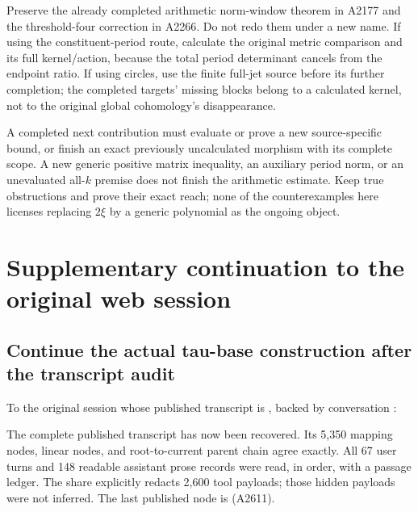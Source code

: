 Preserve the already completed arithmetic norm-window theorem in A2177
and the threshold-four correction in A2266. Do not redo them under a new
name. If using the constituent-period route, calculate the original
metric comparison and its full kernel/action, because the total period
determinant cancels from the endpoint ratio. If using circles, use the
finite full-jet source before its further completion; the completed
targets' missing blocks belong to a calculated kernel, not to the
original global cohomology's disappearance.

A completed next contribution must evaluate or prove a new
source-specific bound, or finish an exact previously uncalculated
morphism with its complete scope. A new generic positive matrix
inequality, an auxiliary period norm, or an unevaluated all-\(k\)
premise does not finish the arithmetic estimate. Keep true obstructions
and prove their exact reach; none of the counterexamples here licenses
replacing \(2\xi\) by a generic polynomial as the ongoing object.

\clearpage

\section{Supplementary continuation to the original web
session}\label{supplementary-continuation-to-the-original-web-session}

\subsection{Continue the actual tau-base construction after the
transcript
audit}\label{continue-the-actual-tau-base-construction-after-the-transcript-audit}

To the original session whose published transcript is
\href{https://chatgpt.com/share/6aa6bc6e-98cc-83eb-9343-e811c26d6631}{\protect{}},
backed by conversation
\protect{}:

The complete published transcript has now been recovered. Its 5,350
mapping nodes, linear nodes, and root-to-current parent chain agree
exactly. All 67 user turns and 148 readable assistant prose records were
read, in order, with a passage ledger. The share explicitly redacts
2,600 tool payloads; those hidden payloads were not inferred. The last
published node is \protect{}
(A2611).

